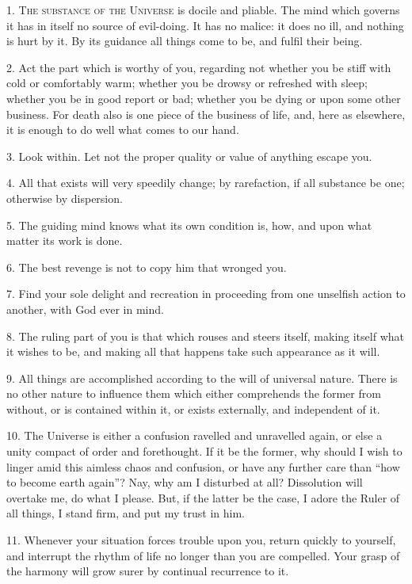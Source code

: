 \documentclass{book}
\begin{document}
1. \textsc{The substance of the Universe} is docile and pliable. The
mind which governs it has in itself no source of evil-doing. It has no
malice: it does no ill, and nothing is hurt by it. By its guidance all
things come to be, and fulfil their being.

2. Act the part which is worthy of you, regarding not whether you be
stiff with cold or comfortably warm; whether you be drowsy or
refreshed with sleep; whether you be in good report or bad; whether
you be dying or upon some other business. For death also is one piece
of the business of life, and, here as elsewhere, it is enough to do
well what comes to our hand.

3. Look within. Let not the proper quality or value of anything escape
you.

4. All that exists will very speedily change; by rarefaction, if all
substance be one; otherwise by dispersion.

5. The guiding mind knows what its own condition is, how, and upon
what matter its work is done.

6. The best revenge is not to copy him that wronged you.

\newpage

7. Find your sole delight and recreation in proceeding from one
unselfish action to another, with God ever in mind.

8. The ruling part of you is that which rouses and steers itself,
making itself what it wishes to be, and making all that happens take
such appearance as it will.

9. All things are accomplished according to the will of universal
nature. There is no other nature to influence them which either
comprehends the former from without, or is contained within it, or
exists externally, and independent of it.

10. The Universe is either a confusion ravelled and unravelled again,
or else a unity compact of order and forethought. If it be the former,
why should I wish to linger amid this aimless chaos and confusion, or
have any further care than ``how to become earth again''? Nay, why am I
disturbed at all? Dissolution will overtake me, do what I please. But,
if the latter be the case, I adore the Ruler of all things, I stand
firm, and put my trust in him.

11. Whenever your situation forces trouble upon you, return quickly to
yourself, and interrupt the rhythm of life no longer than you are
compelled. Your grasp of the harmony will grow surer by continual
recurrence to it.
\end{document}
